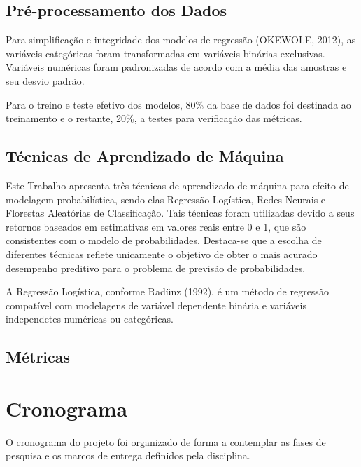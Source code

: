 \documentclass[english, spanish, brazilian]{RBIEarticle} %
\begin{document}
\subsection{Pré-processamento dos Dados}
Para simplificação e integridade dos modelos de regressão (OKEWOLE, 2012), as variáveis categóricas foram transformadas em variáveis binárias exclusivas. Variáveis numéricas foram padronizadas de acordo com a média das amostras e seu desvio padrão.

Para o treino e teste efetivo dos modelos, 80\% da base de dados foi destinada ao treinamento e o restante, 20\%, a testes para verificação das métricas. 

\subsection{Técnicas de Aprendizado de Máquina}
Este Trabalho apresenta três técnicas de aprendizado de máquina para efeito de modelagem probabilística, sendo elas Regressão Logística, Redes Neurais e Florestas Aleatórias de Classificação. Tais técnicas foram utilizadas devido a seus retornos baseados em estimativas em valores reais entre 0 e 1, que são consistentes com o modelo de probabilidades. Destaca-se que a escolha de diferentes técnicas reflete unicamente o objetivo de obter o mais acurado desempenho preditivo para o problema de previsão de probabilidades.

A Regressão Logística, conforme Radünz (1992), é um método de regressão compatível com modelagens de variável dependente binária e variáveis independetes numéricas ou categóricas. 

\subsection{Métricas}

\section{Cronograma}
O cronograma do projeto foi organizado de forma a contemplar as fases de pesquisa e os marcos de entrega definidos pela disciplina.
\end{document}
